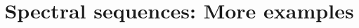 \documentclass{ximera}
\title{Spectral sequences: More examples}
\begin{document}
\begin{abstract}

\end{abstract}
\maketitle

\end{document}
